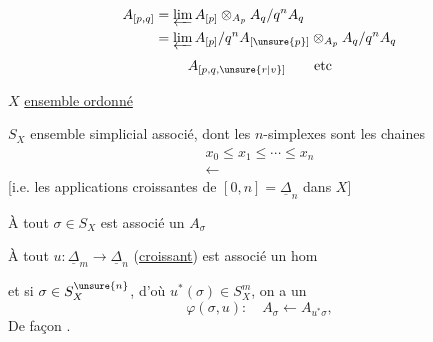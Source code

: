 \[
\begin{aligned}
A_{[p,q]}&=\varprojlim A_{[p]}\otimes_{A_p}A_q/q^n A_q\\
&=\varprojlim A_{[p]}/q^n A_{[\unsure{p}]}\otimes_{A_p}A_q/q^n A_q
\end{aligned}
\]
\[A_{[p,q,\unsure{r|v}]}\qquad\text{etc}\]

$X$ \uline{ensemble ordonné}

$S_X$ ensemble simplicial associé, dont les $n$-simplexes sont les chaines
\[
\begin{aligned}
x_0\leq x_1\leq\cdots\leq x_n\\
\longleftarrow
\end{aligned}
\]
[i.e. les applications croissantes de $[0,n]=\underline\Delta_n$ dans $X$]

À tout $\sigma\in S_X$ est associé un $A_\sigma$

À tout    $u:\underline\Delta_m\longrightarrow\underline\Delta_n$ (\uline{croissant}) est associé un hom

et si $\sigma\in S_X^{\unsure{n}}$, d'où $u^*(\sigma)\in S_X^m$, on a un 
\[
\varphi(\sigma,u):\quad A_\sigma\longleftarrow A_{u^*\sigma},
\]
De façon .
